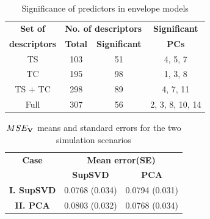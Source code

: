 \documentclass[11pt]{llncs}
\begin{document}
\begin{table}[ht]\centering
    \begin{tabular}{|c|c|c|c|}\hline
    \textbf{Set of}      & \multicolumn{2}{c|}{\textbf{No. of descriptors}} & \textbf{Significant}\\\cline{2-3}
    \textbf{descriptors} & \hspace{.1cm}\textbf{Total}\hspace{.1cm}              & \textbf{Significant} & \textbf{PCs}\\\hline\hline
    TS          & 103                & 51         & 4, 5, 7 \\\hline
    TC          & 195                & 98         & 1, 3, 8\\\hline
    TS + TC     & 298                & 89         & 4, 7, 11\\\hline
    Full        & 307                & 56         &  2, 3, 8, 10, 14\\\hline
    \end{tabular}
    \caption{Significance of predictors in envelope models}
\end{table}

\begin{table}[H]\centering
    \begin{tabular}{|c|c|c|}
    \hline
    \textbf{Case}      & \multicolumn{2}{c|}{\textbf{Mean error(SE)}}              \\ \cline{2-3}
             & \textbf{SupSVD}         & \textbf{PCA}            \\ \hline\hline
    \hspace{.2cm}\textbf{I. SupSVD}\hspace{.2cm} & \hspace{.2cm}0.0768 (0.034)\hspace{.2cm} & \hspace{.2cm}0.0794 (0.031)\hspace{.2cm} \\ \hline
    \textbf{II. PCA}   & 0.0803 (0.032) & 0.0768 (0.034) \\ \hline
    \end{tabular}
    \caption{$MSE_{\mathbf{V}}$ means and standard errors for the two simulation scenarios}
\end{table}
\end{document}
